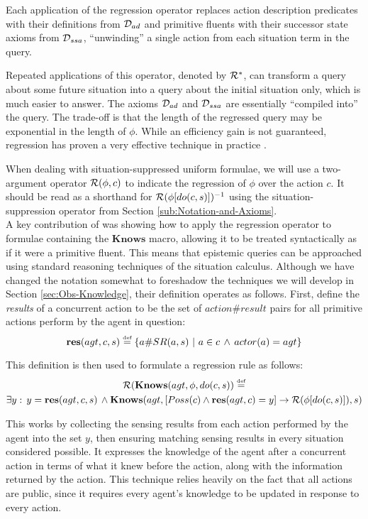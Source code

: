 Each application of the regression operator replaces action description
predicates with their definitions from $\mathcal{D}_{ad}$ and primitive fluents
with their successor state axioms from $\mathcal{D}_{ssa}$, {}``unwinding''
a single action from each situation term in the query.

Repeated applications of this operator, denoted by $\mathcal{R}^{*}$, can
transform a query about some future situation into a query about the
initial situation only, which is much easier to answer. The axioms
$\mathcal{D}_{ad}$ and $\mathcal{D}_{ssa}$ are essentially {}``compiled into''
the query. The trade-off is that the length of the regressed query
may be exponential in the length of $\phi$. While an efficiency gain
is not guaranteed, regression has proven a very effective technique
in practice \cite{levesque97golog,pirri99contributions_sitcalc}.

When dealing with situation-suppressed uniform formulae, we will use
a two-argument operator $\mathcal{R}(\phi,c)$ to indicate the regression
of $\phi$ over the action $c$. It should be read as a shorthand
for $\mathcal{R}(\phi[do(c,s)])^{-1}$ using the situation-suppression operator
from Section \ref{sub:Notation-and-Axioms}.\\


A key contribution of \cite{scherl03sc_knowledge} was showing how
to apply the regression operator to formulae containing the $\mathbf{Knows}$
macro, allowing it to be treated syntactically as if it were a primitive
fluent. This means that epistemic queries can be approached using
standard reasoning techniques of the situation calculus. Although
we have changed the notation somewhat to foreshadow the techniques
we will develop in Section \ref{sec:Obs-Knowledge}, their definition
operates as follows. First, define the \emph{results} of a concurrent
action to be the set of $action\#result$ pairs for all primitive
actions perform by the agent in question:\[
\mathbf{res}(agt,c,s)\stackrel{\mbox{\tiny def}}{=}\{a\#SR(a,s)\,\,|\,\, a\in c\,\wedge\, actor(a)=agt\}\]


This definition is then used to formulate a regression rule as follows:\begin{multline}
\mathcal{R}(\mathbf{Knows}(agt,\phi,do(c,s))\stackrel{\mbox{\tiny def}}{=}\\
\exists y:\, y=\mathbf{res}(agt,c,s)\,\wedge\mathbf{Knows}(agt,\left[Poss(c)\wedge\mathbf{res}(agt,c)=y\right]\rightarrow\mathcal{R}(\phi[do(c,s)]),s)\label{eq:reg_k_std}\end{multline}


This works by collecting the sensing results from each action performed
by the agent into the set $y$, then ensuring matching sensing results
in every situation considered possible. It expresses the knowledge
of the agent after a concurrent action in terms of what it knew before
the action, along with the information returned by the action. This
technique relies heavily on the fact that all actions are public,
since it requires every agent's knowledge to be updated in response
to every action.

